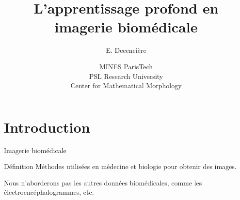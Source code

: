 \documentclass[xcolor=pdftex,dvipsnames,table,mathserif]{beamer}
\title{L'apprentissage profond en imagerie biomédicale}
\author{E. Decencière}
\date{MINES ParisTech\\
  PSL Research University\\
  Center for Mathematical Morphology
}
\begin{document}
\begin{frame}
  \titlepage
\end{frame}


\section{Introduction}

\begin{frame}{Imagerie biomédicale}

  \begin{block}{Définition}
    Méthodes utilisées en médecine et biologie pour obtenir des images.
  \end{block}

Nous n'aborderons pas les autres données biomédicales, comme les électroencéphalogrammes, etc.

\end{frame}
\end{document}
